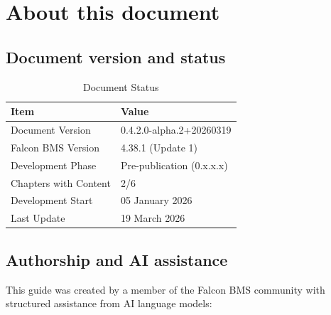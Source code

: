 \documentclass[11pt, a4paper, twoside]{report}
\newcommand{\docversion}{0.4.2.0-alpha.2}
\newcommand{\docbuild}{20260319}
\newcommand{\docstartdate}{05 January 2026}
\newcommand{\docenddate}{19 March 2026}
\newcommand{\chapterscompletedof}{2/6}
\newcommand{\fulldocversion}{\docversion+\docbuild}
\begin{document}
\section{About this document}
\label{sec:C1-S4}

\subsection{Document version and status}
\label{sec:C1-S4-S1}

\begin{table}[H]
	\centering
	\caption{Document Status}
	\label{tab:C1-doc-status}
	\small
	\renewcommand{\arraystretch}{1.25}
	\begin{tabular}{L{4.5cm} L{9.0cm}}
		\toprule
		\textbf{Item} & \textbf{Value} \\
		\midrule
		Document Version & \fulldocversion \\
		Falcon BMS Version & 4.38.1 (Update 1) \\
		Development Phase & Pre-publication (0.x.x.x) \\
		Chapters with Content & \chapterscompletedof \\
		Development Start & \docstartdate \\
		Last Update & \docenddate \\
		\bottomrule
	\end{tabular}
\end{table}

\subsection{Authorship and AI assistance}
\label{sec:C1-S4-S2}

This guide was created by a member of the Falcon BMS community with structured assistance from AI language models:
\end{document}
